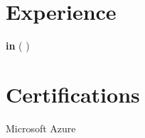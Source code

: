 \documentclass[a4paper,10pt]{article}
\begin{document}

\section*{Experience}
\noindent
\begin{compactitem}
    
    \item \textbf{  in  }  (  )  \\
     
    
\end{compactitem}



\section*{Certifications}
\noindent
\begin{compactitem}
    
        \item Microsoft Azure \hfill \textit{  }
    
\end{compactitem}
\end{document}
